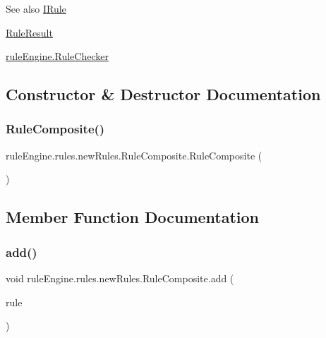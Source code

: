 \begin{DoxySeeAlso}{See also}
\mbox{\hyperlink{interfacerule_engine_1_1rules_1_1new_rules_1_1_i_rule}{I\+Rule}} 

\mbox{\hyperlink{classrule_engine_1_1_rule_result}{Rule\+Result}} 

\mbox{\hyperlink{classrule_engine_1_1_rule_checker}{rule\+Engine.\+Rule\+Checker}} 
\end{DoxySeeAlso}


\subsection{Constructor \& Destructor Documentation}
\mbox{\label{classrule_engine_1_1rules_1_1new_rules_1_1_rule_composite_aad1f440c22fc4ba22bd8fb7bcb18ed46}} 
\subsubsection{\texorpdfstring{Rule\+Composite()}{RuleComposite()}}
{\footnotesize\ttfamily rule\+Engine.\+rules.\+new\+Rules.\+Rule\+Composite.\+Rule\+Composite (\begin{DoxyParamCaption}{ }\end{DoxyParamCaption})\hspace{0.3cm}{\ttfamily [inline]}}



\subsection{Member Function Documentation}
\mbox{\label{classrule_engine_1_1rules_1_1new_rules_1_1_rule_composite_a4970c2904b55542c6c7323195a38c845}} 
\subsubsection{\texorpdfstring{add()}{add()}}
{\footnotesize\ttfamily void rule\+Engine.\+rules.\+new\+Rules.\+Rule\+Composite.\+add (\begin{DoxyParamCaption}\item[{\mbox{\hyperlink{interfacerule_engine_1_1rules_1_1new_rules_1_1_i_rule}{I\+Rule}}}]{rule }\end{DoxyParamCaption})\hspace{0.3cm}{\ttfamily [inline]}}

